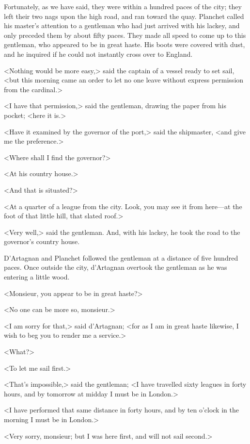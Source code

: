 Fortunately, as we have said, they were within a hundred paces of the city; they left their two nags upon the high road, and ran toward the quay. Planchet called his master's attention to a gentleman who had just arrived with his lackey, and only preceded them by about fifty paces. They made all speed to come up to this gentleman, who appeared to be in great haste. His boots were covered with dust, and he inquired if he could not instantly cross over to England. 

<Nothing would be more easy,> said the captain of a vessel ready to set sail, <but this morning came an order to let no one leave without express permission from the cardinal.> 

<I have that permission,> said the gentleman, drawing the paper from his pocket; <here it is.> 

<Have it examined by the governor of the port,> said the shipmaster, <and give me the preference.> 

<Where shall I find the governor?> 

<At his country house.> 

<And that is situated?> 

<At a quarter of a league from the city. Look, you may see it from here---at the foot of that little hill, that slated roof.> 

<Very well,> said the gentleman. And, with his lackey, he took the road to the governor's country house. 

D'Artagnan and Planchet followed the gentleman at a distance of five hundred paces. Once outside the city, d'Artagnan overtook the gentleman as he was entering a little wood. 

<Monsieur, you appear to be in great haste?> 

<No one can be more so, monsieur.> 

<I am sorry for that,> said d'Artagnan; <for as I am in great haste likewise, I wish to beg you to render me a service.> 

<What?> 

<To let me sail first.> 

<That's impossible,> said the gentleman; <I have travelled sixty leagues in forty hours, and by tomorrow at midday I must be in London.> 

<I have performed that same distance in forty hours, and by ten o'clock in the morning I must be in London.> 

<Very sorry, monsieur; but I was here first, and will not sail second.> 

